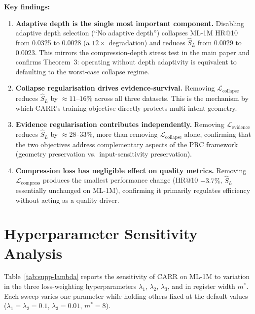 \documentclass[letterpaper,10pt]{article}
\begin{document}
\noindent\textbf{Key findings:}
\begin{enumerate}
  \item \textbf{Adaptive depth is the single most important component.} Disabling adaptive depth selection (``No adaptive depth'') collapses ML-1M HR@10 from 0.0325 to 0.0028 (a $12\times$ degradation) and reduces $\widehat{S}_L$ from 0.0029 to 0.0023. This mirrors the compression-depth stress test in the main paper and confirms Theorem~3: operating without depth adaptivity is equivalent to defaulting to the worst-case collapse regime.
  \item \textbf{Collapse regularisation drives evidence-survival.} Removing $\mathcal{L}_{\mathrm{collapse}}$ reduces $\widehat{S}_L$ by $\approx 11$--$16\%$ across all three datasets. This is the mechanism by which CARR's training objective directly protects multi-intent geometry.
  \item \textbf{Evidence regularisation contributes independently.} Removing $\mathcal{L}_{\mathrm{evidence}}$ reduces $\widehat{S}_L$ by $\approx 28$--$33\%$, more than removing $\mathcal{L}_{\mathrm{collapse}}$ alone, confirming that the two objectives address complementary aspects of the PRC framework (geometry preservation vs.\ input-sensitivity preservation).
  \item \textbf{Compression loss has negligible effect on quality metrics.} Removing $\mathcal{L}_{\mathrm{compress}}$ produces the smallest performance change (HR@10 $-3.7\%$, $\widehat{S}_L$ essentially unchanged on ML-1M), confirming it primarily regulates efficiency without acting as a quality driver.
\end{enumerate}

\section{Hyperparameter Sensitivity Analysis}
\label{sec:supp-hyperparams}

Table~\ref{tab:supp-lambda} reports the sensitivity of CARR on ML-1M to variation in the three loss-weighting hyperparameters $\lambda_1$, $\lambda_2$, $\lambda_3$, and in register width $m^*$. Each sweep varies one parameter while holding others fixed at the default values ($\lambda_1 = \lambda_2 = 0.1$, $\lambda_3 = 0.01$, $m^* = 8$).
\end{document}

